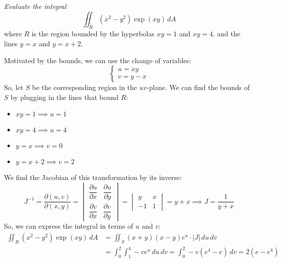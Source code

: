 \documentclass[11pt]{report}
\begin{document}
\begin{example}
    \textit{Evaluate the integral}
    $$
        \iint_R (x^2 - y^2) \exp(xy) \, dA
    $$
    where $R$ is the region bounded by the hyperbolas $xy=1$ and $xy=4$, and the lines $y=x$ and $y=x+2$.

    Motivated by the bounds, we can use the change of variables:
    $$
    \begin{cases}
        u = xy \\
        v = y - x
    \end{cases}
    $$
    So, let $S$ be the corresponding region in the $uv$-plane. We can find the bounds of $S$ by plugging in the lines that bound $R$:   
    \begin{itemize}
        \item $xy = 1 \implies u = 1$
        \item $xy = 4 \implies u = 4$
        \item $y = x \implies v = 0$
        \item $y = x + 2 \implies v = 2$
    \end{itemize}
    We find the Jacobian of this transformation by its inverse:
    $$
    J^{-1} = \frac{\partial(u,v)}{\partial(x,y)} = \begin{vmatrix}
        \dfrac{\partial u}{\partial x} & \dfrac{\partial u}{\partial y} \\
        \dfrac{\partial v}{\partial x} & \dfrac{\partial v}{\partial y}
    \end{vmatrix} = \begin{vmatrix}
        y & x \\
        -1 & 1
    \end{vmatrix} = y + x \implies J = \frac{1}{y + x}
    $$
    So, we can express the integral in terms of $u$ and $v$:
    \begin{align*}
        \iint_R (x^2 - y^2) \exp(xy) \, dA &= \iint_S (x+y)(x-y)e^u \cdot |J| \, du \, dv \\
        &= \int_0^2 \int_1^4 -v e^u \, du \, dv = \int_0^2 -v(e^4 - e) \, dv = 2(e - e^4)
    \end{align*}
\end{example}
\end{document}

